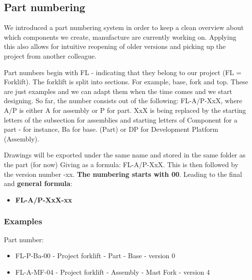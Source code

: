 \documentclass[../report.tex]{subfiles}
\begin{document}
    
    \subsection{Part numbering}
    We introduced a part numbering system in order to keep a clean overview about
    which components we create, manufacture are currently working on. Applying this 
    also allows for intuitive reopening of older versions and picking up the project
    from another colleague.

    Part numbers begin with FL - indicating that they belong to our project (FL = Forklift). 
    The forklift is split into sections. For example, base, fork and top. These are just
    examples and we can adapt them when the time comes and we start designing.
    So far, the number consists out of the following: FL-A/P-XxX, where A/P is either A for assembly or P for part. 
    XxX is being replaced by the starting
    letters  of the subsection for assemblies and starting letters of Component for a part - for instance, Ba for base. (Part)
    or DP for Development Platform (Assembly).
    
    Drawings will be exported under the same name and stored in the same folder as the part (for now)
    Giving as a formula:
    FL-A/P-XxX. This is then followed by the version number -xx. \textbf{The numbering starts with 00}. Leading to the final 
    and 
    \textbf{general formula}:

    \begin{itemize}
        \item \textbf{FL-A/P-XxX-xx}
    \end{itemize}

    \subsubsection{Examples}
    Part number: 
    \begin{itemize}
        \item FL-P-Ba-00 - Project forklift - Part - Base - version 0 
        \item FL-A-MF-04 - Project forklift - Assembly - Mast Fork - version 4
    \end{itemize}
\end{document}
